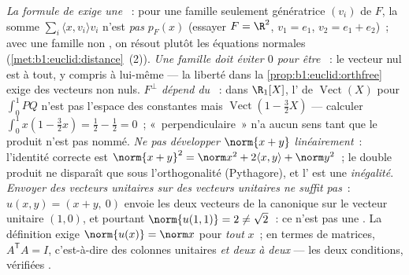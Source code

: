 \begin{remark}
\label{rem:b1:euclid:pitfalls}
\emph{La formule de  exige une  }~: pour
une famille seulement génératrice $(v_i)$ de $F$, la somme
$\sum_i\langle x, v_i\rangle v_i$ n'est \emph{pas} $p_F(x)$
(essayer $F = \R^2$, $v_1 = e_1$, $v_2 = e_1 + e_2$)~; avec une
famille non , on résout plutôt les équations normales
(\cref{met:b1:euclid:distance}~(2)).
\emph{Une famille  doit éviter $0$ pour être }~: le
vecteur nul est  à tout, y compris à lui-même --- la
liberté dans la \cref{prop:b1:euclid:orthfree} exige des vecteurs non
nuls.
\emph{$F^\perp$ dépend du }~: dans $\R_1[X]$,
l' de $\operatorname{Vect}(X)$ pour $\int_0^1 PQ$ n'est
pas l'espace des constantes mais $\operatorname{Vect}(1 - \frac32
X)$ --- calculer $\int_0^1 x(1 - \frac32 x) = \frac12 - \frac12 =
0$~; «~perpendiculaire~» n'a aucun sens tant que le produit n'est
pas nommé.
\emph{Ne pas développer $\norm{x + y}$ linéairement}~: l'identité
correcte est $\norm{x+y}^2 = \norm x^2 + 2\langle x, y\rangle +
\norm y^2$~; le double produit ne disparaît que sous
l'orthogonalité (Pythagore), et l' est une
\emph{inégalité}.
\emph{Envoyer des vecteurs unitaires sur des vecteurs unitaires ne
suffit pas}~: $u(x, y) = (x + y,\ 0)$ envoie les deux vecteurs de
la  canonique sur le vecteur unitaire $(1, 0)$, et pourtant
$\norm{u(1,1)} = 2 \neq \sqrt2$~: ce n'est pas une . La
définition exige $\norm{u(x)} = \norm x$ pour \emph{tout} $x$~; en
termes de matrices, $A^{\mathsf T}A = I$, c'est-à-dire des colonnes
unitaires \emph{et deux à deux } --- les deux
conditions, vérifiées .
\end{remark}

